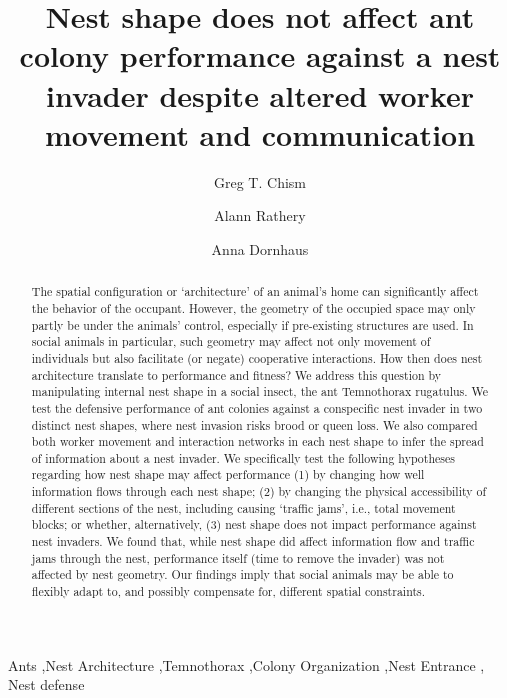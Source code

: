 \documentclass[3p]{elsarticle} %
\begin{document}
\begin{frontmatter}

  \title{Nest shape does not affect ant colony performance against a
nest invader despite altered worker movement and communication}
    \author[a]{Greg T. Chism}
    \author[b]{Alann Rathery}
  
    \author[c]{Anna Dornhaus}
  
  
  \begin{abstract}
  The spatial configuration or `architecture' of an animal's home can
  significantly affect the behavior of the occupant. However, the
  geometry of the occupied space may only partly be under the animals'
  control, especially if pre-existing structures are used. In social
  animals in particular, such geometry may affect not only movement of
  individuals but also facilitate (or negate) cooperative interactions.
  How then does nest architecture translate to performance and fitness?
  We address this question by manipulating internal nest shape in a
  social insect, the ant Temnothorax rugatulus. We test the defensive
  performance of ant colonies against a conspecific nest invader in two
  distinct nest shapes, where nest invasion risks brood or queen loss.
  We also compared both worker movement and interaction networks in each
  nest shape to infer the spread of information about a nest invader. We
  specifically test the following hypotheses regarding how nest shape
  may affect performance (1) by changing how well information flows
  through each nest shape; (2) by changing the physical accessibility of
  different sections of the nest, including causing `traffic jams',
  i.e., total movement blocks; or whether, alternatively, (3) nest shape
  does not impact performance against nest invaders. We found that,
  while nest shape did affect information flow and traffic jams through
  the nest, performance itself (time to remove the invader) was not
  affected by nest geometry. Our findings imply that social animals may
  be able to flexibly adapt to, and possibly compensate for, different
  spatial constraints.
  \end{abstract}
    \begin{keyword}
    Ants \sep Nest Architecture \sep Temnothorax \sep Colony
Organization \sep Nest Entrance \sep 
    Nest defense
  \end{keyword}
  
 \end{frontmatter}
\end{document}

